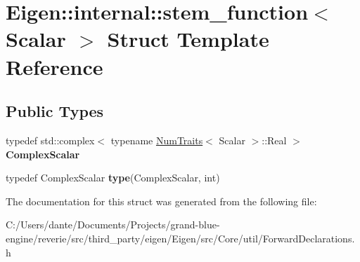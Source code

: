 \hypertarget{struct_eigen_1_1internal_1_1stem__function}{}\section{Eigen\+::internal\+::stem\+\_\+function$<$ Scalar $>$ Struct Template Reference}
\label{struct_eigen_1_1internal_1_1stem__function}
\subsection*{Public Types}
\begin{DoxyCompactItemize}
\item 
\mbox{\label{struct_eigen_1_1internal_1_1stem__function_a4cb6ecae530bb609c00fb2a40ab41e97}} 
typedef std\+::complex$<$ typename \mbox{\hyperlink{struct_eigen_1_1_num_traits}{Num\+Traits}}$<$ Scalar $>$\+::Real $>$ {\bfseries Complex\+Scalar}
\item 
\mbox{\label{struct_eigen_1_1internal_1_1stem__function_a091a1081100e894c221d75ac3ea614d4}} 
typedef Complex\+Scalar {\bfseries type}(Complex\+Scalar, int)
\end{DoxyCompactItemize}


The documentation for this struct was generated from the following file\+:\begin{DoxyCompactItemize}
\item 
C\+:/\+Users/dante/\+Documents/\+Projects/grand-\/blue-\/engine/reverie/src/third\+\_\+party/eigen/\+Eigen/src/\+Core/util/Forward\+Declarations.\+h\end{DoxyCompactItemize}
